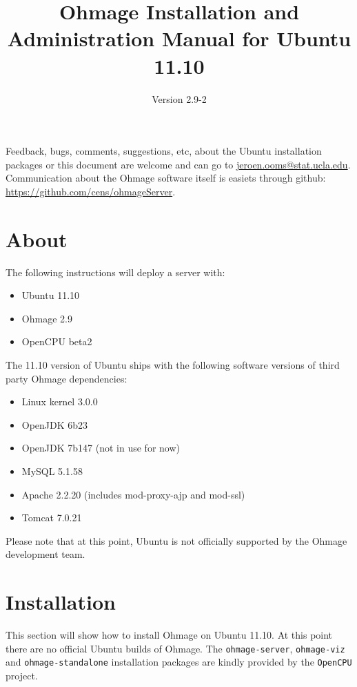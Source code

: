 \documentclass{scrartcl}
\title{Ohmage Installation and Administration Manual for Ubuntu 11.10}
\subtitle{Version 2.9-2}
\begin{document}
\maketitle

\noindent Feedback, bugs, comments, suggestions, etc, about the Ubuntu
installation packages or this document are welcome and can go to
\href{mailto:jeroen.ooms@stat.ucla.edu}{jeroen.ooms@stat.ucla.edu}.
Communication about the Ohmage software itself is easiets through github:
\href{https://github.com/cens/ohmageServer}{https://github.com/cens/ohmageServer}.


\section*{About}

The following instructions will deploy a server with:

\begin{itemize}
  \item Ubuntu 11.10
  \item Ohmage 2.9
  \item OpenCPU beta2
\end{itemize}

\noindent The 11.10 version of Ubuntu ships with the following
software versions of third party Ohmage dependencies:

\begin{itemize}
  \item Linux kernel 3.0.0
  \item OpenJDK 6b23
  \item OpenJDK 7b147 (not in use for now)
  \item MySQL 5.1.58
  \item Apache 2.2.20 (includes mod-proxy-ajp and mod-ssl)
  \item Tomcat 7.0.21
\end{itemize}

\noindent Please note that at this point, Ubuntu is not officially
supported by the Ohmage development team.

\section{Installation}

This section will show how to install Ohmage on Ubuntu 11.10. At this
point there are no official Ubuntu builds of Ohmage. The
\texttt{ohmage-server}, \texttt{ohmage-viz} and \texttt{ohmage-standalone} installation packages are kindly provided by the \texttt{OpenCPU} project.
\end{document}
